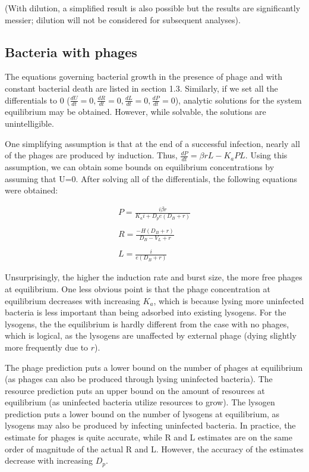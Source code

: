 \documentclass{article}
\begin{document}
(With dilution, a simplified result is also possible but the results are significantly messier; dilution will not be considered for subsequent analyses). 

\subsection{Bacteria with phages}
The equations governing bacterial growth in the presence of phage and with constant bacterial death are listed in section 1.3. Similarly, if we set all the differentials to 0 ($
\frac{dU}{dt} = 0, \frac{dR}{dt} = 0, \frac{dL}{dt} = 0, \frac{dP}{dt} = 0
$), analytic solutions for the system equilibrium may be obtained. However, while solvable, the solutions are unintelligible.  

One simplifying assumption is that at the end of a successful infection, nearly all of the phages are produced by induction. Thus, $\frac{dP}{dt} = \beta r L - K_a P L$. Using this assumption, we can obtain some bounds on equilibrium concentrations by assuming that U=0. After solving all of the differentials, the following equations were obtained:

\begin{equation}
\begin{split}
P = \frac{i \beta r }{K_a i + D_p e (D_B+r)} \\ \\
R = \frac{-H (D_B + r)}{D_B - V_L + r} \\ \\
L = \frac{i}{e (D_B + r)}
\end{split}
\end{equation}

Unsurprisingly, the higher the induction rate and burst size, the more free phages at equilibrium. One less obvious point is that the phage concentration at equilibrium decreases with increasing $K_a$, which is because lysing more uninfected bacteria is less important than being adsorbed into existing lysogens. For the lysogens, the the equilibrium is hardly different from the case with no phages, which is logical, as the lysogens are unaffected by external phage (dying slightly more frequently due to $r$).

The phage prediction puts a lower bound on the number of phages at equilibrium (as phages can also be produced through lysing uninfected bacteria). The resource prediction puts an upper bound on the amount of resources at equilibrium (as uninfected bacteria utilize resources to grow). The lysogen prediction puts a lower bound on the number of lysogens at equilibrium, as lysogens may also be produced by infecting uninfected bacteria. In practice, the estimate for phages is quite accurate, while R and L estimates are on the same order of magnitude of the actual R and L. However, the accuracy of the estimates decrease with increasing $D_p$.
\end{document}
